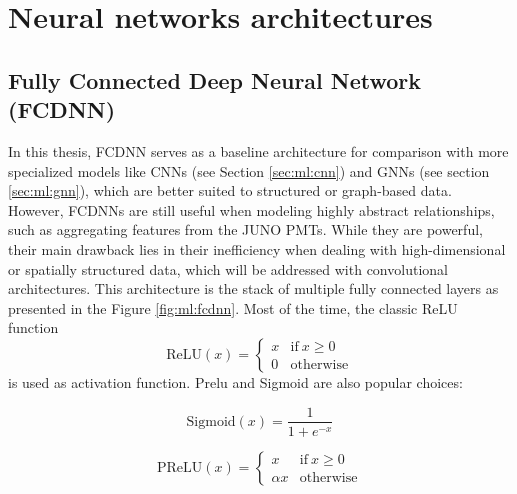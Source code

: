 \documentclass[../main.tex]{subfiles}
\begin{document}
\section{Neural networks architectures}
\label{sec:ml:architecture}

\subsection{Fully Connected Deep Neural Network (FCDNN)}
\label{sec:ml:fcdnn}

In this thesis, FCDNN serves as a baseline architecture for comparison with more specialized models like CNNs (see Section \ref{sec:ml:cnn}) and GNNs (see section \ref{sec:ml:gnn}), which are better suited to structured or graph-based data. However, FCDNNs are still useful when modeling highly abstract relationships, such as aggregating features from the JUNO PMTs. While they are powerful, their main drawback lies in their inefficiency when dealing with high-dimensional or spatially structured data, which will be addressed with convolutional architectures.
This architecture is the stack of multiple fully connected layers as presented in the Figure \ref{fig:ml:fcdnn}. Most of the time, the classic ReLU function
\begin{equation}
  \label{eq:ml:relu}
  \mathrm{ReLU}(x) = \begin{cases}
    x & \mathrm{if} ~ x \geq 0 \\
    0 & \mathrm{otherwise}
  \end{cases}
\end{equation}
is used as activation function. Prelu and Sigmoid are also popular choices:


\begin{minipage}{0.5\linewidth}
  \begin{equation}
    \label{sec:ml:sigmoid}
    \mathrm{Sigmoid}(x) = \frac{1}{1+ e^{-x}}
  \end{equation}
\end{minipage}
\begin{minipage}{0.5\linewidth}
  \begin{equation}
    \label{sec:ml:prelu}
    \mathrm{PReLU}(x) = \begin{cases}
      x & \mathrm{if} ~ x \geq 0 \\
      \alpha x & \mathrm{otherwise}
    \end{cases}
  \end{equation}
\end{minipage}
\end{document}
